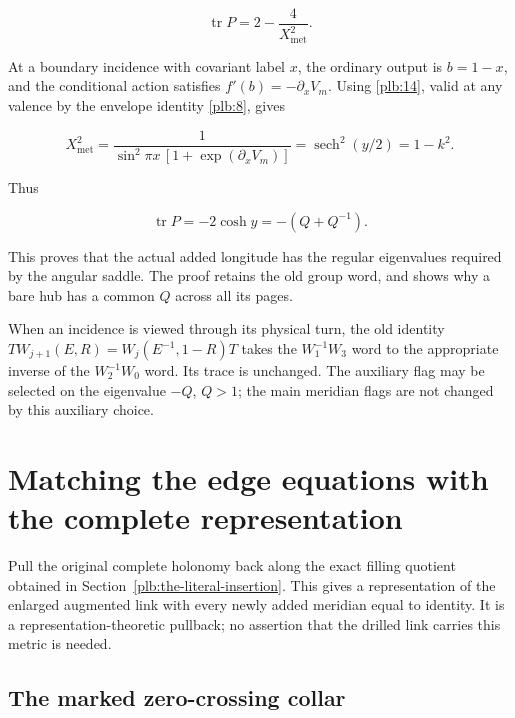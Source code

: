 \begin{equation}\label{plb:18}
\operatorname{tr}P=2-\frac4{X_{\mathrm{met}}^2}.
\end{equation}

At a boundary incidence with covariant label \(x\), the ordinary output is \(b=1-x\), and the conditional action satisfies \(f'(b)=-\partial_xV_m\). Using \eqref{plb:14}, valid at any valence by the envelope identity \eqref{plb:8}, gives

\begin{equation}\label{plb:19}
X_{\mathrm{met}}^2
 =\frac1{\sin^2\pi x\,[1+\exp(\partial_xV_m)]}
 =\operatorname{sech}^2(y/2)=1-k^2.
\end{equation}

Thus

\begin{equation}\label{plb:20}
\operatorname{tr}P=-2\cosh y=-(Q+Q^{-1}).
\end{equation}

This proves that the actual added longitude has the regular eigenvalues required by the angular saddle. The proof retains the old group word, and shows why a bare hub has a common \(Q\) across all its pages.

When an incidence is viewed through its physical turn, the old identity
\(T W_{j+1}(E,R)=W_j(E^{-1},1-R)T\)
takes the \(W_1^{-1}W_3\) word to the appropriate inverse of the \(W_2^{-1}W_0\) word. Its trace is unchanged. The auxiliary flag may be selected on the eigenvalue \(-Q\), \(Q>1\); the main meridian flags are not changed by this auxiliary choice.

\section{Matching the edge equations with the complete representation}\label{plb:what-the-edge-equations-see-at-the-complete-bare-representation}

Pull the original complete holonomy back along the exact filling quotient obtained in Section~\ref{plb:the-literal-insertion}. This gives a representation of the enlarged augmented link with every newly added meridian equal to identity. It is a representation-theoretic pullback; no assertion that the drilled link carries this metric is needed.

\subsection{The marked zero-crossing collar}\label{plb:the-marked-zero-crossing-collar}

